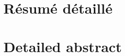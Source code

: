 

\pagevide 







\newpage                    %
\pagevide
\setcounter{page}{0}

\newpage 

\justifying





\chapter{Résumé détaillé}


\chapter{Detailed abstract}


\pagevide
{}
\renewcommand\partie{Sommaire}
\mtcaddchapter
